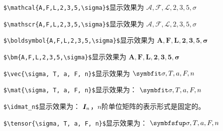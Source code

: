 \begin{example}[mathcal测试]
    \texttt{\$\textbackslash mathcal\{A,F,L,2,3,5,\textbackslash sigma\}\$}显示效果为 $\mathcal{A,F,L,2,3,5,\sigma}$
\end{example}
\begin{example}[mathscr测试]
    \texttt{\$\textbackslash mathscr\{A,F,L,2,3,5,\textbackslash sigma\}\$}显示效果为 $\mathscr{A,F,L,2,3,5,\sigma}$
\end{example}
\begin{example}[boldsymbol测试]
    \texttt{\$\textbackslash boldsymbol\{A,F,L,2,3,5,\textbackslash sigma\}\$}显示效果为 $\boldsymbol{A,F,L,2,3,5,\sigma}$
\end{example}
\begin{example}[bm测试]
    \texttt{\$\textbackslash bm\{A,F,L,2,3,5,\textbackslash sigma\}\$}显示效果为 $\bm{A,F,L,2,3,5,\sigma}$
\end{example}
\begin{example}[向量命令测试]
\texttt{\$\textbackslash vec\{\textbackslash sigma, T, a, F, n\}\$}显示效果为 $\Vector{\sigma, T, a, F, n}$
\end{example}
\begin{example}[矩阵命令测试]
    \texttt{\$\textbackslash mat\{\textbackslash sigma, T, a, F, n\}\$}显示效果为： $\Matrix{\sigma, T, a, F, n}$
\end{example}
\begin{example}[单位矩阵命令测试]
    \texttt{\$\textbackslash idmat\_n\$}显示效果为： $\bm{I}_n$，$n$阶单位矩阵的表示形式是固定的。
\end{example}
\begin{example}[张量命令测试]
    \verb|$\tensor{\sigma, T, a, F, n}$|显示效果为： $\tensor{\sigma, T, a, F, n}$
\end{example}

